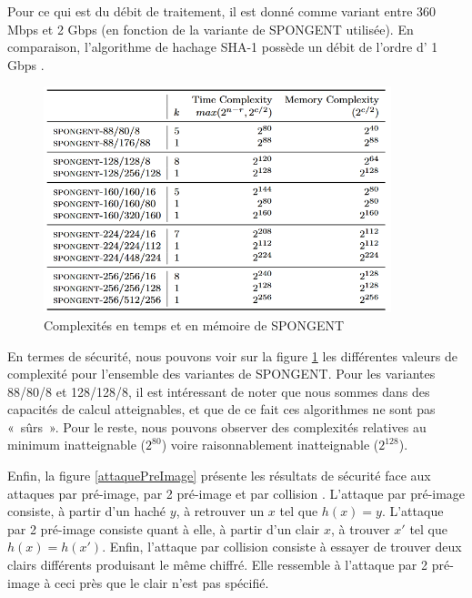 Pour ce qui est du débit de traitement, il est donné comme variant entre 360
Mbps et 2 Gbps (en fonction de la variante de SPONGENT utilisée). En
comparaison, l'algorithme de hachage SHA-1 possède un débit de l'ordre d' 1
Gbps \cite{SHA1}.

\begin{figure}[!h]
	\centering
	\includegraphics[width=0.9\textwidth]{imgs/Spongent/timeComplexity.png}
	\caption{Complexités en temps et en mémoire de SPONGENT}
	\label{timeComplexity}
\end{figure}

En termes de sécurité, nous pouvons voir sur la figure \ref{timeComplexity}
les différentes valeurs de complexité pour l'ensemble des variantes de
SPONGENT. Pour les variantes 88/80/8 et 128/128/8, il est intéressant de
noter que nous sommes dans des capacités de calcul atteignables, et que de
ce fait ces algorithmes ne sont pas « sûrs ». Pour le reste, nous pouvons
observer des complexités relatives au minimum inatteignable ($2^{80}$) voire
raisonnablement inatteignable ($2^{128}$).

Enfin, la figure \ref{attaquePreImage} présente les résultats de sécurité
face aux attaques par pré-image, par 2 pré-image et par collision
\cite{googleSpongent}. L'attaque par pré-image consiste, à partir d'un haché
$y$, à retrouver un $x$ tel que $h(x) = y$. L'attaque par 2
pré-image consiste quant à elle, à partir d'un clair $x$, à trouver $x'$ tel
que $h(x) = h(x')$. Enfin, l'attaque par collision consiste à essayer de
trouver deux clairs différents produisant le même chiffré. Elle ressemble à
l'attaque par 2 pré-image à ceci près que le clair n'est pas
spécifié.

